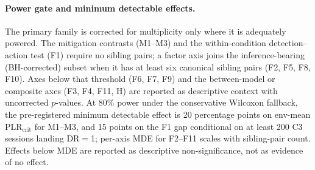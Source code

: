 \begin{table}[h]
\centering
\small
{}
\caption{The pre-registered primary tests. Each is a single-axis or single-condition contrast on session-level $\text{PLR}_{\text{crit}}$. Benjamini--Hochberg correction is applied across the inference-bearing subset selected by the power gate below; the remaining axes are reported as descriptive context with uncorrected $p$-values.}
\label{tab:claims}
\end{table}

\paragraph{Power gate and minimum detectable effects.} The primary family is corrected for multiplicity only where it is adequately powered. The mitigation contrasts (M1--M3) and the within-condition detection--action test (F1) require no sibling pairs; a factor axis joins the inference-bearing (BH-corrected) subset when it has at least six canonical sibling pairs (F2, F5, F8, F10). Axes below that threshold (F6, F7, F9) and the between-model or composite axes (F3, F4, F11, H) are reported as descriptive context with uncorrected $p$-values. At 80\% power under the conservative Wilcoxon fallback, the pre-registered minimum detectable effect is 20 percentage points on env-mean $\text{PLR}_{\text{crit}}$ for M1--M3, and 15 points on the F1 gap conditional on at least 200 C3 sessions landing DR$=$1; per-axis MDE for F2--F11 scales with sibling-pair count. Effects below MDE are reported as descriptive non-significance, not as evidence of no effect.


